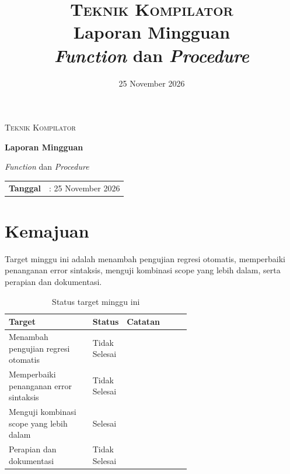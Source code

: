 \documentclass[11pt,a4paper]{article}
\title{
  \vspace{-1.5cm}
  {\Large\scshape Teknik Kompilator}\\[0.35cm]
  {\Huge\bfseries Laporan Mingguan}\\[0.35cm]
  {\LARGE \textit{Function} dan \textit{Procedure}}
}
\author{}
\date{25 November 2026}
\begin{document}
\hypersetup{pageanchor=false}
\begin{titlepage}
\centering
\thispagestyle{empty}

\vspace*{2.2cm}
{\Large\scshape Teknik Kompilator\par}

\vspace{1.8cm}
{\Huge\bfseries Laporan Mingguan\par}
\vspace{0.7cm}
{\LARGE \textit{Function} dan \textit{Procedure}\par}

\vspace{2.2cm}
\begin{tabular}{>{\bfseries}rl}
Tanggal     & : 25 November 2026 \\[0.35cm]
\end{tabular}

\vfill

\vspace{1.2cm}
\end{titlepage}
\setcounter{page}{2}
\hypersetup{pageanchor=true}

\tableofcontents
\newpage


\section{Kemajuan}

Target minggu ini adalah menambah pengujian regresi otomatis, memperbaiki penanganan error sintaksis, menguji kombinasi scope yang lebih dalam, serta perapian dan dokumentasi.

\begin{table}[ht]
\centering
\caption{Status target minggu ini}
\label{tab:target}
\begin{tabularx}{\linewidth}{@{}p{0.46\linewidth}p{0.16\linewidth}X@{}}
\toprule
\textbf{Target} & \textbf{Status} & \textbf{Catatan} \\
\midrule
Menambah pengujian regresi otomatis
  & Tidak Selesai & \\
Memperbaiki penanganan error sintaksis
  & Tidak Selesai & \\
Menguji kombinasi scope yang lebih dalam
  & Selesai & \\
Perapian dan dokumentasi
  & Tidak Selesai & \\
\bottomrule
\end{tabularx}
\end{table}
\end{document}
